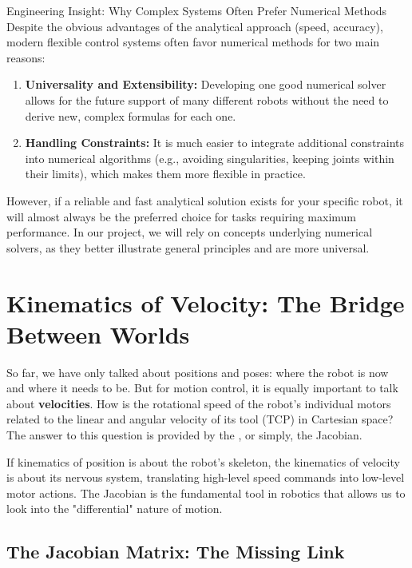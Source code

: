 \begin{tipbox}{Engineering Insight: Why Complex Systems Often Prefer Numerical Methods}
Despite the obvious advantages of the analytical approach (speed, accuracy), modern flexible control systems often favor numerical methods for two main reasons:
\begin{enumerate}
    \item \textbf{Universality and Extensibility:} Developing one good numerical solver allows for the future support of many different robots without the need to derive new, complex formulas for each one.
    \item \textbf{Handling Constraints:} It is much easier to integrate additional constraints into numerical algorithms (e.g., avoiding singularities, keeping joints within their limits), which makes them more flexible in practice.
\end{enumerate}
However, if a reliable and fast analytical solution exists for your specific robot, it will almost always be the preferred choice for tasks requiring maximum performance. In our project, we will rely on concepts underlying numerical solvers, as they better illustrate general principles and are more universal.
\end{tipbox}

\section{Kinematics of Velocity: The Bridge Between Worlds}
\label{sec:velocity_kinematics}

So far, we have only talked about positions and poses: where the robot is now and where it needs to be. But for motion control, it is equally important to talk about \textbf{velocities}. How is the rotational speed of the robot's individual motors related to the linear and angular velocity of its tool (TCP) in Cartesian space? The answer to this question is provided by the , or simply, the Jacobian.

If kinematics of position is about the robot's skeleton, the kinematics of velocity is about its nervous system, translating high-level speed commands into low-level motor actions. The Jacobian is the fundamental tool in robotics that allows us to look into the "differential" nature of motion.

\subsection{The Jacobian Matrix: The Missing Link}

